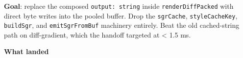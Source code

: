 \textbf{Goal}: replace the composed \texttt{o\allowbreak{}u\allowbreak{}t\allowbreak{}p\allowbreak{}u\allowbreak{}t\allowbreak{}:\allowbreak{} \allowbreak{}s\allowbreak{}t\allowbreak{}r\allowbreak{}i\allowbreak{}n\allowbreak{}g} inside \texttt{r\allowbreak{}e\allowbreak{}n\allowbreak{}d\allowbreak{}e\allowbreak{}r\allowbreak{}D\allowbreak{}i\allowbreak{}f\allowbreak{}f\allowbreak{}P\allowbreak{}a\allowbreak{}c\allowbreak{}k\allowbreak{}e\allowbreak{}d} with direct byte writes into the pooled buffer. Drop the \texttt{s\allowbreak{}g\allowbreak{}r\allowbreak{}C\allowbreak{}a\allowbreak{}c\allowbreak{}h\allowbreak{}e}, \texttt{s\allowbreak{}t\allowbreak{}y\allowbreak{}l\allowbreak{}e\allowbreak{}C\allowbreak{}a\allowbreak{}c\allowbreak{}h\allowbreak{}e\allowbreak{}K\allowbreak{}e\allowbreak{}y}, \texttt{b\allowbreak{}u\allowbreak{}i\allowbreak{}l\allowbreak{}d\allowbreak{}S\allowbreak{}g\allowbreak{}r}, and \texttt{e\allowbreak{}m\allowbreak{}i\allowbreak{}t\allowbreak{}S\allowbreak{}g\allowbreak{}r\allowbreak{}F\allowbreak{}r\allowbreak{}o\allowbreak{}m\allowbreak{}B\allowbreak{}u\allowbreak{}f} machinery entirely. Beat the old cached-string path on diff-gradient, which the handoff targeted at \textless{} 1.5 ms.

\textbf{What landed}

